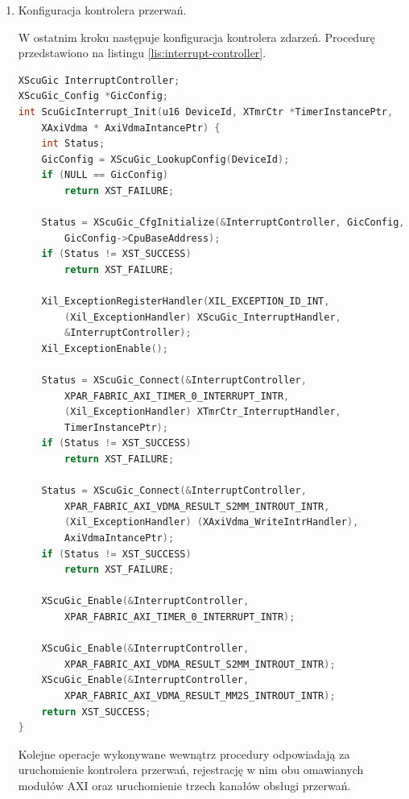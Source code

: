 {\begin{enumerate}
\begin{lstlisting}[language=C, caption=Rejestracja agentów przerwań., label=lis:interrupt-handlers-2]
XAxiVdma_SetCallBack(AxiVdmaInstancePtr, XAXIVDMA_HANDLER_GENERAL,
	&AxiRead_InterruptHandler, AxiVdmaInstancePtr, XAXIVDMA_READ);

XTmrCtr_SetHandler(TimerInstancePtr, Timer_InterruptHandler, TimerInstancePtr);
\end{lstlisting}

	\item Konfiguracja kontrolera przerwań.
	
W ostatnim kroku następuje konfiguracja kontrolera zdarzeń. Procedurę przedstawiono na listingu \ref{lis:interrupt-controller}.

\begin{lstlisting}[language=C, caption=Konfiguracja kontrolera przerwań., label=lis:interrupt-controller]
XScuGic InterruptController;
XScuGic_Config *GicConfig;
int ScuGicInterrupt_Init(u16 DeviceId, XTmrCtr *TimerInstancePtr,
	XAxiVdma * AxiVdmaIntancePtr) {
	int Status;
	GicConfig = XScuGic_LookupConfig(DeviceId);
	if (NULL == GicConfig)
		return XST_FAILURE;
	
	Status = XScuGic_CfgInitialize(&InterruptController, GicConfig,
		GicConfig->CpuBaseAddress);
	if (Status != XST_SUCCESS)
		return XST_FAILURE;
	
	Xil_ExceptionRegisterHandler(XIL_EXCEPTION_ID_INT,
		(Xil_ExceptionHandler) XScuGic_InterruptHandler,
		&InterruptController);
	Xil_ExceptionEnable();
	
	Status = XScuGic_Connect(&InterruptController,
		XPAR_FABRIC_AXI_TIMER_0_INTERRUPT_INTR,
		(Xil_ExceptionHandler) XTmrCtr_InterruptHandler,
		TimerInstancePtr);
	if (Status != XST_SUCCESS)
		return XST_FAILURE;
	
	Status = XScuGic_Connect(&InterruptController,
		XPAR_FABRIC_AXI_VDMA_RESULT_S2MM_INTROUT_INTR,
		(Xil_ExceptionHandler) (XAxiVdma_WriteIntrHandler),
		AxiVdmaIntancePtr);
	if (Status != XST_SUCCESS)
		return XST_FAILURE;
	
	XScuGic_Enable(&InterruptController,
		XPAR_FABRIC_AXI_TIMER_0_INTERRUPT_INTR);
	
	XScuGic_Enable(&InterruptController,
		XPAR_FABRIC_AXI_VDMA_RESULT_S2MM_INTROUT_INTR);
	XScuGic_Enable(&InterruptController,
		XPAR_FABRIC_AXI_VDMA_RESULT_MM2S_INTROUT_INTR);
	return XST_SUCCESS;
}
\end{lstlisting}

Kolejne operacje wykonywane wewnątrz procedury odpowiadają za uruchomienie kontrolera przerwań, rejestrację w nim obu omawianych modułów AXI oraz uruchomienie trzech kanałów obsługi przerwań.
\end{enumerate}

}

